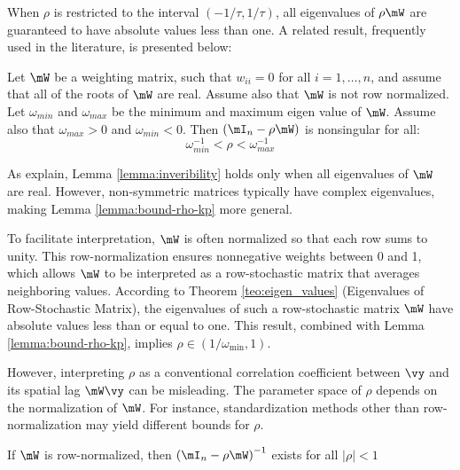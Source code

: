\documentclass[english,12pt]{book}\usepackage[]{graphicx}\usepackage[]{xcolor}
\begin{document}
When $\rho$ is restricted to the interval $(-1/\tau, 1/\tau)$, all eigenvalues of $\rho\mW$ are guaranteed to have absolute values less than one. A related result, frequently used in the literature, is presented below:

\begin{lemma}[Invertibility]\label{lemma:inveribility}
Let $\mW$ be a weighting matrix, such that $w_{ii} = 0$ for all $i = 1,\ldots,n$, and assume that all of the roots of $\mW$ are real. Assume also that $\mW$ is not row normalized. Let $\omega_{min}$ and $\omega_{max}$ be the minimum and maximum eigen value of $\mW$. Assume also that $\omega_{max} > 0$ and $\omega_{min} < 0$. Then $\left(\mI_n - \rho\mW\right)$ is nonsingular for all:
\begin{equation*}
  \omega_{min}^{-1} < \rho < \omega_{max}^{-1}
\end{equation*}
\end{lemma}

As \cite{kelejian2010specification} explain, Lemma \ref{lemma:inveribility} holds only when all eigenvalues of $\mW$ are real. However, non-symmetric matrices typically have complex eigenvalues, making Lemma \ref{lemma:bound-rho-kp} more general.

To facilitate interpretation, $\mW$ is often normalized so that each row sums to unity. This row-normalization ensures nonnegative weights between 0 and 1, which allows $\mW$ to be interpreted as a row-stochastic matrix that averages neighboring values. According to Theorem \ref{teo:eigen_values} (Eigenvalues of Row-Stochastic Matrix), the eigenvalues of such a row-stochastic matrix $\mW$ have absolute values less than or equal to one. This result, combined with Lemma \ref{lemma:bound-rho-kp}, implies $\rho \in (1/\omega_{\textrm{min}}, 1)$.

However, interpreting $\rho$ as a conventional correlation coefficient between $\vy$ and its spatial lag $\mW\vy$ can be misleading. The parameter space of $\rho$ depends on the normalization of $\mW$. For instance, standardization methods other than row-normalization may yield different bounds for $\rho$. 

\begin{lemma}\label{lemma:invert-W-row}
If $\mW$ is row-normalized, then  $\left(\mI_n - \rho\mW\right)^{-1}$ exists for all $\left|\rho \right| < 1$
\end{lemma}
\end{document}
